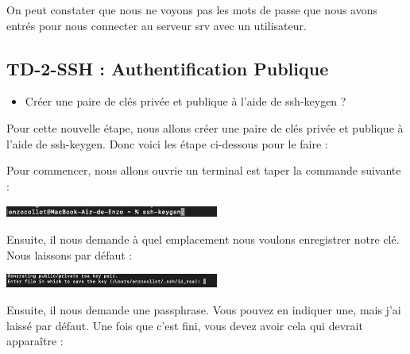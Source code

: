 \documentclass[12pt]{article}
\begin{document}
\vspace{0.3cm}

On peut constater que nous ne voyons pas les mots de passe que nous avons entrés pour nous connecter au serveur srv avec un utilisateur.


\subsection{TD-2-SSH : Authentification Publique}

\vspace{0.3cm}

\begin{itemize}
  \item Créer une paire de clés privée et publique à l'aide de ssh-keygen ?
\end{itemize}

Pour cette nouvelle étape, nous allons créer une paire de clés privée et publique à l'aide de ssh-keygen. Donc voici les étape ci-dessous pour le faire : 

\vspace{0.3cm}

Pour commencer, nous allons ouvrie un terminal est taper la commande suivante  : 

\vspace{0.3cm}

\begin{center}
  \includegraphics[width=7cm]{Image-TD-SSH-2/ssh-keygen.png}
\end{center}

\vspace{0.3cm}

Ensuite, il nous demande à quel emplacement nous voulons enregistrer notre clé. Nous laissons par défaut :

\vspace{0.3cm}

\begin{center}
  \includegraphics[width=7cm]{Image-TD-SSH-2/Emplacement-cle.png}
\end{center}

\vspace{0.3cm}

\newpage


Ensuite, il nous demande une passphrase. Vous pouvez en indiquer une, mais j'ai laissé par défaut. Une fois que c'est fini, vous devez avoir cela qui devrait apparaître :
\end{document}
